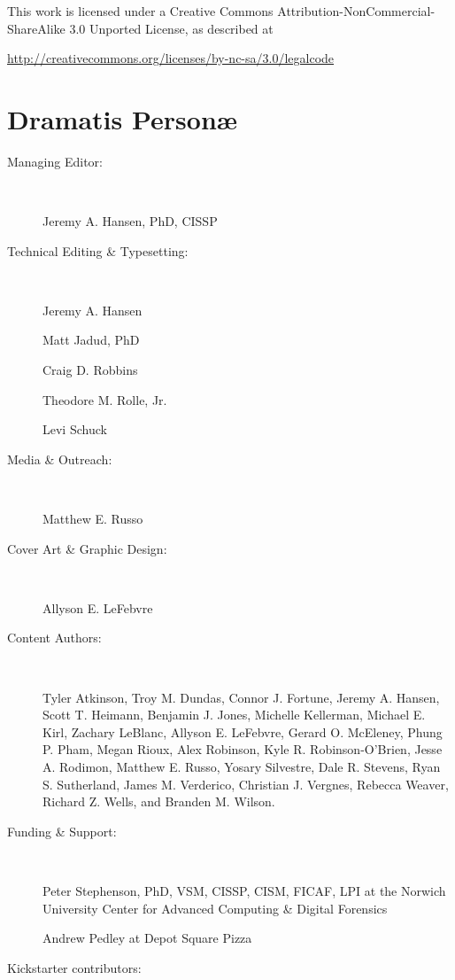 \documentclass[11pt,final]{book}
\begin{document}
\vspace{1in}

\noindent This work is licensed under a Creative Commons Attribution-NonCommercial-ShareAlike 3.0 Unported License, as described at \newline

\noindent \footnotesize \url{http://creativecommons.org/licenses/by-nc-sa/3.0/legalcode}







   \chapter*{Dramatis Person\ae}

 \begin{description}

 \item[Managing Editor:] ~
 
 Jeremy A. Hansen, PhD, CISSP

 \item[Technical Editing \& Typesetting:] ~
 
 Jeremy A. Hansen
 
 Matt Jadud, PhD
 
 Craig D. Robbins
 
 Theodore M. Rolle, Jr.
 
 Levi Schuck

 \item[Media \& Outreach:] ~
 
 Matthew E. Russo

 \item[Cover Art \& Graphic Design:] ~
 
 Allyson E. LeFebvre

 \item[Content Authors:]\label{ContentAuthors} ~
 
Tyler Atkinson,
Troy M. Dundas,
Connor J. Fortune,
Jeremy A. Hansen,
Scott T. Heimann,
Benjamin J. Jones,
Michelle Kellerman,
Michael E. Kirl,
Zachary LeBlanc,
Allyson E. LeFebvre,
Gerard O. McEleney,
Phung P. Pham,
Megan Rioux,
Alex Robinson,
Kyle R. Robinson-O'Brien,
Jesse A. Rodimon,
Matthew E. Russo,
Yosary Silvestre,
Dale R. Stevens,
Ryan S. Sutherland,
James M. Verderico,
Christian J. Vergnes,
Rebecca Weaver,
Richard Z. Wells, and
Branden M. Wilson.

 \item[Funding \& Support:] ~
 
Peter Stephenson, PhD, VSM, CISSP, CISM, FICAF, LPI at the Norwich University Center for Advanced Computing \& Digital Forensics

Andrew Pedley at Depot Square Pizza

 \item[Kickstarter contributors:] ~  
 



 \end{description}
\end{document}

